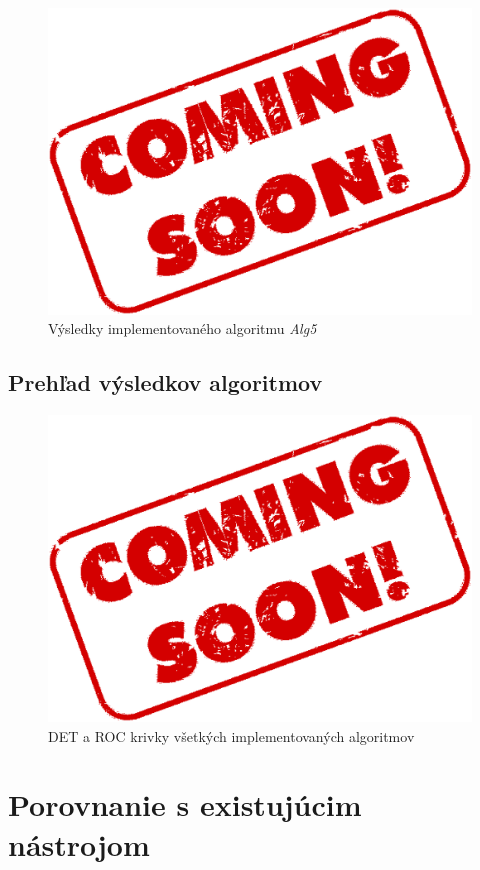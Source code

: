 \documentclass[11pt,a4paper]{article}
\begin{document}
\clearpage

\begin{figure}[ht!]
	\centering
	\includegraphics[width=12cm]{fig/alg5.eps}
	\caption{\label{fig:alg5} Výsledky implementovaného algoritmu \emph{Alg5}}
\end{figure}

\clearpage
\subsection{Prehľad výsledkov algoritmov} \label{vysledky}

\begin{figure}[ht!]
	\centering
	\includegraphics[width=12cm]{fig/alg5.eps}
	\caption{\label{fig:all} DET a ROC krivky všetkých implementovaných algoritmov}
\end{figure}

\clearpage
\section{Porovnanie s existujúcim nástrojom} \label{konalio}
\end{document}
